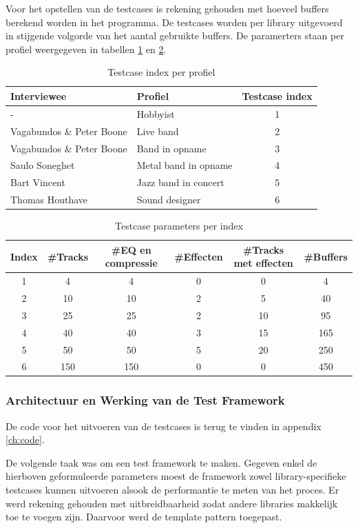 Voor het opstellen van de testcases is rekening gehouden met hoeveel buffers berekend worden in het programma. De testcases worden per library uitgevoerd in stijgende volgorde van het aantal gebruikte buffers. De paramerters staan per profiel weergegeven in tabellen \ref{tab:profielen} en \ref{tab:parameters}. 

\begin{table}[]
\begin{tabular}{ll|c}
\textbf{Interviewee} & \textbf{Profiel} & \textbf{Testcase index} \\ \hline
- & Hobbyist & 1 \\
Vagabundos \& Peter Boone & Live band & 2 \\
Vagabundos \& Peter Boone & Band in opname & 3 \\
Saulo Soneghet & Metal band in opname & 4 \\
Bart Vincent & Jazz band in concert & 5 \\
Thomas Houthave & Sound designer & 6 \\ \hline
\end{tabular}
\caption{Testcase index per profiel}
\label{tab:profielen}
\end{table}

\begin{table}[]
\begin{tabular}{c|cccc|c}
\textbf{Index} & \textbf{\#Tracks} & \textbf{\#EQ en compressie} & \textbf{\#Effecten} & \textbf{\#Tracks met effecten} & \textbf{\#Buffers} \\ \hline
1 & 4 & 4 & 0 & 0 & 4 \\
2 & 10 & 10 & 2 & 5 & 40 \\
3 & 25 & 25 & 2 & 10 & 95 \\
4 & 40 & 40 & 3 & 15 & 165 \\
5 & 50 & 50 & 5 & 20 & 250 \\
6 & 150 & 150 & 0 & 0 & 450 
\end{tabular}
\caption{Testcase parameters per index}
\label{tab:parameters}
\end{table}

\subsubsection{Architectuur en Werking van de Test Framework}

De code voor het uitvoeren van de testcases is terug te vinden in appendix \ref{ch:code}.

De volgende taak was om een test framework te maken. Gegeven enkel de hierboven geformuleerde parameters moest de framework zowel library-specifieke testcases kunnen uitvoeren alsook de performantie te meten van het proces. Er werd rekening gehouden met uitbreidbaarheid zodat andere libraries makkelijk toe te voegen zijn. Daarvoor werd de template pattern toegepast.


